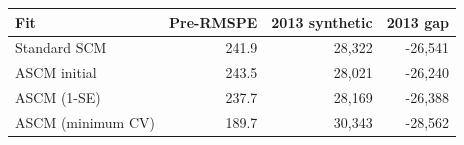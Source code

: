 \begin{tabular}{lrrr}
\toprule
Fit & Pre-RMSPE & 2013 synthetic & 2013 gap \\
\midrule
Standard SCM & 241.9 & 28,322 & -26,541 \\
ASCM initial & 243.5 & 28,021 & -26,240 \\
ASCM (1-SE) & 237.7 & 28,169 & -26,388 \\
ASCM (minimum CV) & 189.7 & 30,343 & -28,562 \\
\bottomrule
\end{tabular}

